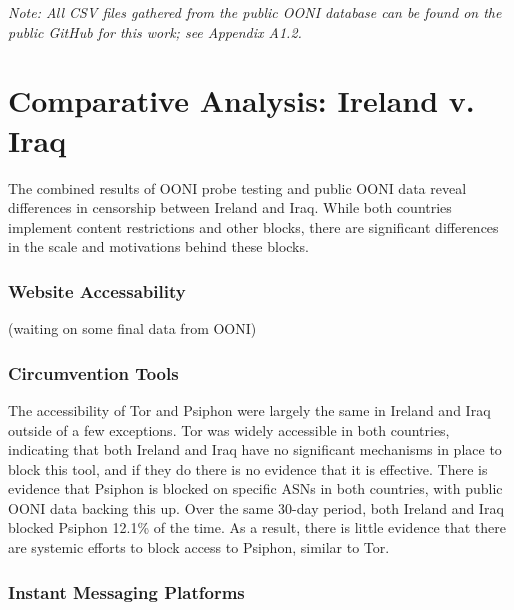 
\textit{Note: All CSV files gathered from the public OONI database can be found on the public GitHub for this work; see Appendix A1.2.}


\section{Comparative Analysis: Ireland v. Iraq}

The combined results of OONI probe testing and public OONI data reveal differences in censorship between Ireland and Iraq. While both countries implement content restrictions and other blocks, there are significant differences in the scale and motivations behind these blocks.

\subsubsection{Website Accessability}

(waiting on some final data from OONI)

\subsubsection{Circumvention Tools}

The accessibility of Tor and Psiphon were largely the same in Ireland and Iraq outside of a few exceptions. Tor was widely accessible in both countries, indicating that both Ireland and Iraq have no significant mechanisms in place to block this tool, and if they do there is no evidence that it is effective. There is evidence that Psiphon is blocked on specific ASNs in both countries, with public OONI data backing this up. Over the same 30-day period, both Ireland and Iraq blocked Psiphon 12.1\% of the time. As a result, there is little evidence that there are systemic efforts to block access to Psiphon, similar to Tor.

\subsubsection{Instant Messaging Platforms}

